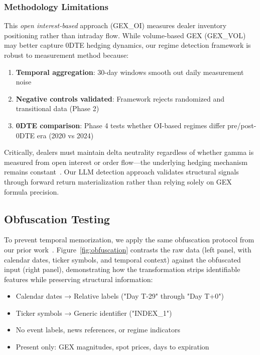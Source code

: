 \subsubsection{Methodology Limitations}

This \textit{open interest-based} approach (GEX\_OI) measures dealer inventory positioning rather than intraday flow. While volume-based GEX (GEX\_VOL) may better capture 0DTE hedging dynamics, our regime detection framework is robust to measurement method because:

\begin{enumerate}
\item \textbf{Temporal aggregation}: 30-day windows smooth out daily measurement noise
\item \textbf{Negative controls validated}: Framework rejects randomized and transitional data (Phase 2)
\item \textbf{0DTE comparison}: Phase 4 tests whether OI-based regimes differ pre/post-0DTE era (2020 vs 2024)
\end{enumerate}

Critically, dealers must maintain delta neutrality regardless of whether gamma is measured from open interest or order flow—the underlying hedging mechanism remains constant~\cite{dim2025zero,ni2005stock}. Our LLM detection approach validates structural signals through forward return materialization rather than relying solely on GEX formula precision.

\subsection{Obfuscation Testing}

To prevent temporal memorization, we apply the same obfuscation protocol from our prior work~\cite{regan2025obfuscation}. Figure~\ref{fig:obfuscation} contrasts the raw data (left panel, with calendar dates, ticker symbols, and temporal context) against the obfuscated input (right panel), demonstrating how the transformation strips identifiable features while preserving structural information:

\begin{itemize}
\item Calendar dates → Relative labels ("Day T-29" through "Day T+0")
\item Ticker symbols → Generic identifier ("INDEX\_1")
\item No event labels, news references, or regime indicators
\item Present only: GEX magnitudes, spot prices, days to expiration
\end{itemize}

